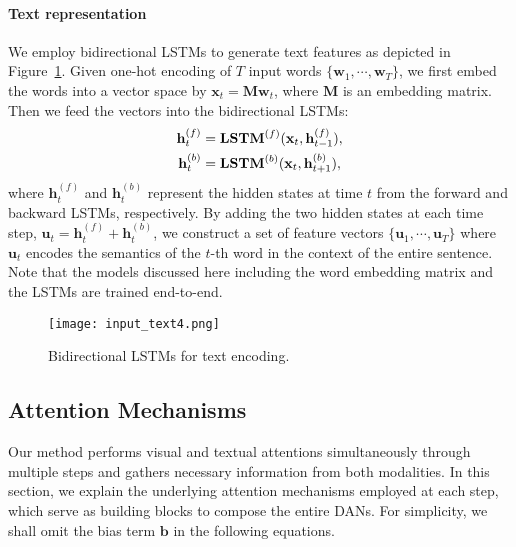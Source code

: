 \documentclass[10pt,twocolumn,letterpaper]{article}
\begin{document}
\paragraph{Text representation}
We employ bidirectional LSTMs to generate text features as depicted in Figure~\ref{fig:input_text}.
Given one-hot encoding of $T$ input words $\{\mathbf{w}_1,\cdots,\mathbf{w}_T\}$, we first embed the words into a vector space by $\mathbf{x}_t = \mathbf{M}\mathbf{w}_t$, where $\mathbf{M}$ is an embedding matrix.
Then we feed the vectors into the bidirectional LSTMs:
\begin{align}
\label{eq:target}
\mathbf{h}_t^{(f)} &= \operatorname{\bf{LSTM}}^{(f)}(\mathbf{x}_t, \mathbf{h}_{t-1}^{(f)}), \\
\mathbf{h}_t^{(b)} &= \operatorname{\bf{LSTM}}^{(b)}(\mathbf{x}_t, \mathbf{h}_{t+1}^{(b)}),
\end{align}
where $\mathbf{h}_t^{(f)}$ and $\mathbf{h}_t^{(b)}$ represent the hidden states at time $t$ from the forward and backward LSTMs, respectively.
By adding the two hidden states at each time step, \ie $\mathbf{u}_t = \mathbf{h}_t^{(f)} + \mathbf{h}_t^{(b)}$, we construct a set of feature vectors $\{\mathbf{u}_1,\cdots,\mathbf{u}_T\}$ where $\mathbf{u}_t$ encodes the semantics of the $t$-th word in the context of the entire sentence.
Note that the models discussed here including the word embedding matrix and the LSTMs are trained end-to-end.

\begin{figure}[t]
\begin{center}
\texttt{[image: input\_text4.png]}
\caption{
Bidirectional LSTMs for text encoding.
}
\label{fig:input_text}
\vspace{-5mm}
\end{center}
\end{figure}

\subsection{Attention Mechanisms}
\label{sub:attention}
Our method performs visual and textual attentions simultaneously through multiple steps and gathers necessary information from both modalities.
In this section, we explain the underlying attention mechanisms employed at each step, which serve as building blocks to compose the entire DANs.
For simplicity, we shall omit the bias term $\mathbf{b}$ in the following equations.
\end{document}
